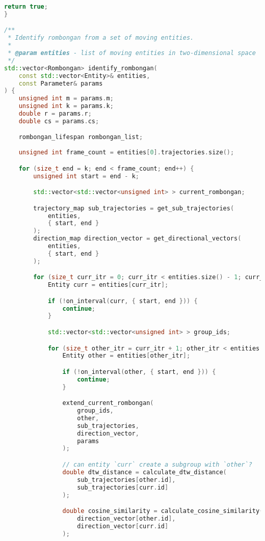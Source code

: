 \begin{lstlisting}[language=C++, caption=Implementasi fungsi \texttt{identify\_rombongan}, label={lamp:identify-rombongan}]
    return true;
}

/**
 * Identify rombongan from a set of moving entities.
 * 
 * @param entities - list of moving entities in two-dimensional space
 */
std::vector<Rombongan> identify_rombongan(
    const std::vector<Entity>& entities,
    const Parameter& params
) {
    unsigned int m = params.m;
    unsigned int k = params.k;
    double r = params.r;
    double cs = params.cs;

    rombongan_lifespan rombongan_list;
    
    unsigned int frame_count = entities[0].trajectories.size();

    for (size_t end = k; end < frame_count; end++) {
        unsigned int start = end - k;

        std::vector<std::vector<unsigned int> > current_rombongan;

        trajectory_map sub_trajectories = get_sub_trajectories(
            entities,
            { start, end }
        );
        direction_map direction_vector = get_directional_vectors(
            entities,
            { start, end }
        );

        for (size_t curr_itr = 0; curr_itr < entities.size() - 1; curr_itr++) {
            Entity curr = entities[curr_itr];

            if (!on_interval(curr, { start, end })) {
                continue;
            }

            std::vector<std::vector<unsigned int> > group_ids;

            for (size_t other_itr = curr_itr + 1; other_itr < entities.size(); other_itr++) {
                Entity other = entities[other_itr];

                if (!on_interval(other, { start, end })) {
                    continue;
                }

                extend_current_rombongan(
                    group_ids,
                    other,
                    sub_trajectories,
                    direction_vector,
                    params
                );

                // can entity `curr` create a subgroup with `other`?
                double dtw_distance = calculate_dtw_distance(
                    sub_trajectories[other.id],
                    sub_trajectories[curr.id]
                );

                double cosine_similarity = calculate_cosine_similarity(
                    direction_vector[other.id],
                    direction_vector[curr.id]
                );


\end{lstlisting}

